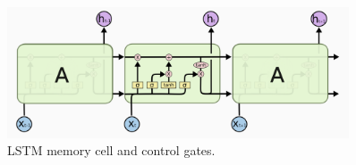 \begin{figure}[!htb]	\includegraphics[width=0.9\textwidth]{images/lstm_cell.png} 
    \centering

\caption{
LSTM memory cell and control gates. \cite{OlahChristopher2015UnderstandingNetworks}
} 

\label{fig:LSTM cell}
\end{figure}